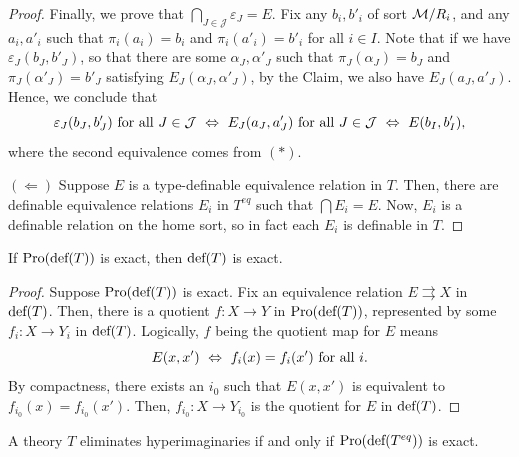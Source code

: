 \begin{proof}
    Finally, we prove that $\bigcap_{J\in\mathcal{J}} \varepsilon_J = E$. Fix any $b_i,b'_i$ of sort $\mathcal{M}/R_i$, and any $a_i,a'_i$ such that $\pi_i(a_i)=b_i$ and $\pi_i(a'_i)=b'_i$ for all $i\in I$. Note that if we have $\varepsilon_J(b_J,b'_J)$, so that there are some $\alpha_J,\alpha'_J$ such that $\pi_J(\alpha_J)=b_J$ and $\pi_J(\alpha'_J)=b'_J$ satisfying $E_J(\alpha_J,\alpha'_J)$, by the Claim, we also have $E_J(a_J,a'_J)$. Hence, we conclude that
    \[\varepsilon_J(b_J,b'_J) \textup{ for all } J\in\mathcal{J} \ \Leftrightarrow \ E_J(a_J,a'_J) \textup{ for all } J\in\mathcal{J} \ \Leftrightarrow \ E(b_I,b'_I), \]
    where the second equivalence comes from $(*)$.

\smallskip

    $(\Leftarrow)$ \quad  Suppose $E$ is a type-definable equivalence relation in $T$. Then, there are definable equivalence relations $E_i$ in $T^{eq}$ such that $\bigcap E_i = E$. Now, $E_i$ is a definable relation on the home sort, so in fact each $E_i$ is definable in $T$. 
\end{proof}

\begin{prop}\label{if prodef exact then def exact}
    If $\textup{Pro}(\textup{def}(T))$ is exact, then $\textup{def}(T)$ is exact.
\end{prop}

\begin{proof}
    Suppose $\textup{Pro}(\textup{def}(T))$ is exact. Fix an equivalence relation $E\rightrightarrows X$ in $\textup{def}(T)$. Then, there is a quotient $f: X\rightarrow Y$ in $\textup{Pro}(\textup{def}(T))$, represented by some $f_i: X\rightarrow Y_i$ in $\textup{def}(T)$. Logically, $f$ being the quotient map for $E$ means 
    \[ E(x,x') \ \Leftrightarrow \ f_i(x)=f_i(x') \textup{ for all }i. \]
    By compactness, there exists an $i_0$ such that $E(x,x')$ is equivalent to $f_{i_0}(x)=f_{i_0}(x')$. Then, $f_{i_0}:X\rightarrow Y_{i_0}$ is the quotient for $E$ in $\textup{def}(T)$.
\end{proof}

\begin{thm}\label{eliminate hyper iff pro exact}
    A theory $T$ eliminates hyperimaginaries if and only if $\textup{Pro}(\textup{def}(T^{eq}))$ is exact.
\end{thm}

